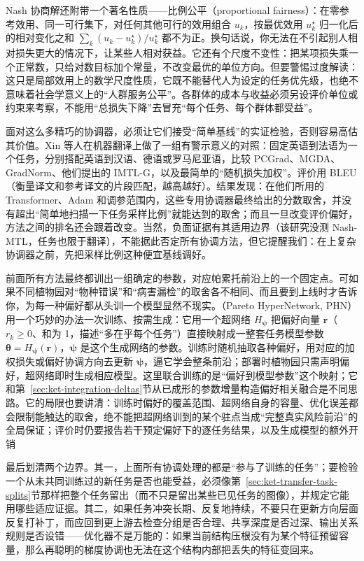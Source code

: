 Nash 协商解还附带一个著名性质——比例公平（proportional fairness）：在零参考效用、同一可行集下，对任何其他可行的效用组合 $u_k$，按最优效用 $u_k^\star$ 归一化后的相对变化之和 $\sum_k(u_k-u_k^\star)/u_k^\star$ 都不为正。换句话说，你无法在不引起别人相对损失更大的情况下，让某些人相对获益。它还有个尺度不变性：把某项损失乘一个正常数，只给对数目标加个常量，不改变最优的单位方向。但要警惕过度解读：这只是局部效用上的数学尺度性质，它既不能替代人为设定的任务优先级，也绝不意味着社会学意义上的“人群服务公平”。各群体的成本与收益必须另设评价单位或约束来考察，不能用“总损失下降”去冒充“每个任务、每个群体都受益”。

面对这么多精巧的协调器，必须让它们接受“简单基线”的实证检验，否则容易高估其价值。Xin 等人在机器翻译上做了一组有警示意义的对照：固定英语到法语为一个任务，分别搭配英语到汉语、德语或罗马尼亚语，比较 PCGrad、MGDA、GradNorm、他们提出的 IMTL-G，以及最简单的“随机损失加权”。评价用 BLEU（衡量译文和参考译文的片段匹配，越高越好）。结果发现：在他们所用的 Transformer、Adam 和调参范围内，这些专用协调器最终给出的分数取舍，并没有超出“简单地扫描一下任务采样比例”就能达到的取舍；而且一旦改变评价偏好，方法之间的排名还会跟着改变。当然，负面证据有其适用边界（该研究没测 Nash-MTL，任务也限于翻译），不能据此否定所有协调方法，但它提醒我们：在上复杂协调器之前，先把采样比例这种便宜基线调好。

前面所有方法最终都训出一组确定的参数，对应帕累托前沿上的一个固定点。可如果不同植物园对“物种错误”和“病害漏检”的取舍各不相同、而且要到上线时才告诉你，为每一种偏好都从头训一个模型显然不现实。（Pareto HyperNetwork, PHN）用一个巧妙的办法一次训练、按需生成：它用一个超网络 $H_{\bm\psi}$ 把偏好向量 $\bm r$（$r_k\geq0$、和为 1，描述“多在乎每个任务”）直接映射成一整套任务模型参数 $\bm\theta=H_{\bm\psi}(\bm r)$，$\bm\psi$ 是这个生成网络的参数。训练时随机抽取各种偏好，用对应的加权损失或偏好协调方向去更新 $\bm\psi$，逼它学会整条前沿；部署时植物园只需声明偏好，超网络即时生成相应模型。这里联合训练的是“偏好到模型参数”这个映射；它和第~\ref{sec:ket-integration-deltas}节从已成形的参数增量构造偏好相关融合是不同思路。它的局限也要讲清：训练时偏好的覆盖范围、超网络自身的容量、优化误差都会限制能触达的取舍，绝不能把超网络训到的某个驻点当成“完整真实风险前沿”的全局保证；评价时仍要报告若干预定偏好下的逐任务结果，以及生成模型的额外开销

最后划清两个边界。其一，上面所有协调处理的都是“参与了训练的任务”；要检验一个从未共同训练过的新任务是否也能受益，必须像第~\ref{sec:ket-transfer-task-splits}节那样把整个任务留出（而不只是留出某些已见任务的图像），并规定它能用哪些适应证据。其二，如果任务冲突长期、反复地持续，不要只在更新方向层面反复打补丁，而应回到更上游去检查分组是否合理、共享深度是否过深、输出关系规则是否设错——优化器不是万能的：如果当前结构压根没有为某个特征预留容量，那么再聪明的梯度协调也无法在这个结构内部把丢失的特征变回来。

